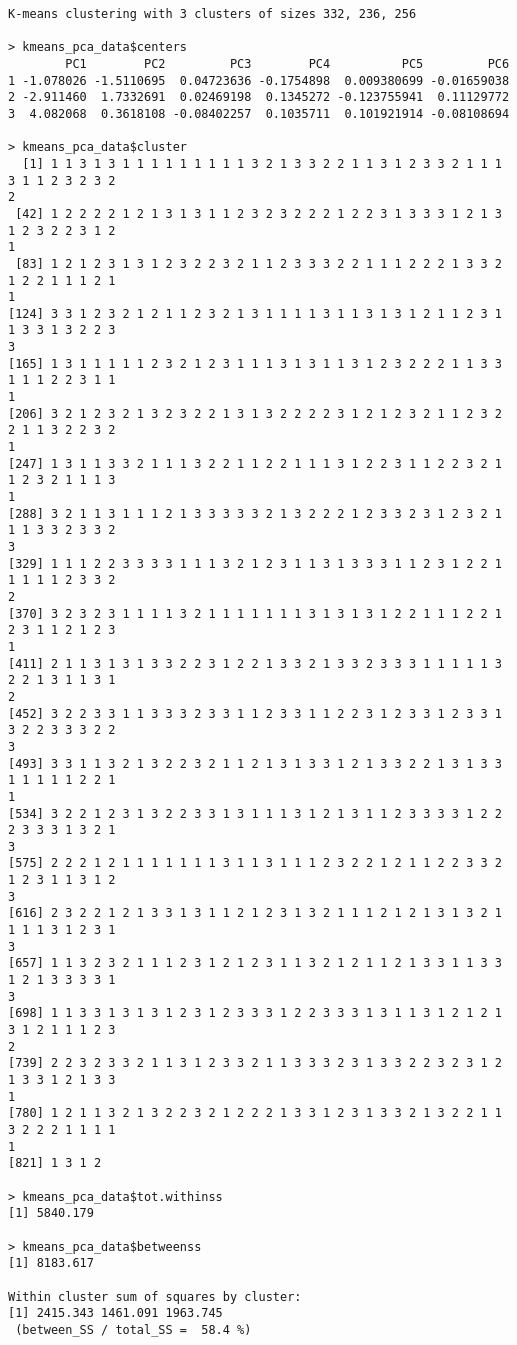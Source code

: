 \documentclass[11pt]{article}
\begin{document}
\begin{lstlisting}
K-means clustering with 3 clusters of sizes 332, 236, 256

> kmeans_pca_data$centers
        PC1        PC2         PC3        PC4          PC5         PC6
1 -1.078026 -1.5110695  0.04723636 -0.1754898  0.009380699 -0.01659038
2 -2.911460  1.7332691  0.02469198  0.1345272 -0.123755941  0.11129772
3  4.082068  0.3618108 -0.08402257  0.1035711  0.101921914 -0.08108694

> kmeans_pca_data$cluster
  [1] 1 1 3 1 3 1 1 1 1 1 1 1 1 1 3 2 1 3 3 2 2 1 1 3 1 2 3 3 2 1 1 1 3 1 1 2 3 2 3 2 
2
 [42] 1 2 2 2 2 1 2 1 3 1 3 1 1 2 3 2 3 2 2 2 1 2 2 3 1 3 3 3 1 2 1 3 1 2 3 2 2 3 1 2 
1
 [83] 1 2 1 2 3 1 3 1 2 3 2 2 3 2 1 1 2 3 3 3 2 2 1 1 1 2 2 2 1 3 3 2 1 2 2 1 1 1 2 1 
1
[124] 3 3 1 2 3 2 1 2 1 1 2 3 2 1 3 1 1 1 1 3 1 1 3 1 3 1 2 1 1 2 3 1 1 3 3 1 3 2 2 3 
3
[165] 1 3 1 1 1 1 1 2 3 2 1 2 3 1 1 1 3 1 3 1 1 3 1 2 3 2 2 2 1 1 3 3 1 1 1 2 2 3 1 1 
1
[206] 3 2 1 2 3 2 1 3 2 3 2 2 1 3 1 3 2 2 2 2 3 1 2 1 2 3 2 1 1 2 3 2 2 1 1 3 2 2 3 2 
1
[247] 1 3 1 1 3 3 2 1 1 1 3 2 2 1 1 2 2 1 1 1 3 1 2 2 3 1 1 2 2 3 2 1 1 2 3 2 1 1 1 3 
1
[288] 3 2 1 1 3 1 1 1 2 1 3 3 3 3 3 2 1 3 2 2 2 1 2 3 3 2 3 1 2 3 2 1 1 1 3 3 2 3 3 2 
3
[329] 1 1 1 2 2 3 3 3 3 1 1 1 3 2 1 2 3 1 1 3 1 3 3 3 1 1 2 3 1 2 2 1 1 1 1 1 2 3 3 2 
2
[370] 3 2 3 2 3 1 1 1 1 3 2 1 1 1 1 1 1 1 3 1 3 1 3 1 2 2 1 1 1 2 2 1 2 3 1 1 2 1 2 3 
1
[411] 2 1 1 3 1 3 1 3 3 2 2 3 1 2 2 1 3 3 2 1 3 3 2 3 3 3 1 1 1 1 1 3 2 2 1 3 1 1 3 1 
2
[452] 3 2 2 3 3 1 1 3 3 3 2 3 3 1 1 2 3 3 1 1 2 2 3 1 2 3 3 1 2 3 3 1 3 2 2 3 3 3 2 2 
3
[493] 3 3 1 1 3 2 1 3 2 2 3 2 1 1 2 1 3 1 3 3 1 2 1 3 3 2 2 1 3 1 3 3 1 1 1 1 1 2 2 1 
1
[534] 3 2 2 1 2 3 1 3 2 2 3 3 1 3 1 1 1 3 1 2 1 3 1 1 2 3 3 3 3 1 2 2 2 3 3 3 1 3 2 1 
3
[575] 2 2 2 1 2 1 1 1 1 1 1 1 3 1 1 3 1 1 1 2 3 2 2 1 2 1 1 2 2 3 3 2 1 2 3 1 1 3 1 2 
3
[616] 2 3 2 2 1 2 1 3 3 1 3 1 1 2 1 2 3 1 3 2 1 1 1 2 1 2 1 3 1 3 2 1 1 1 1 3 1 2 3 1 
3
[657] 1 1 3 2 3 2 1 1 1 2 3 1 2 1 2 3 1 1 3 2 1 2 1 1 2 1 3 3 1 1 3 3 1 2 1 3 3 3 3 1 
3
[698] 1 1 3 3 1 3 1 3 1 2 3 1 2 3 3 3 1 2 2 3 3 3 1 3 1 1 3 1 2 1 2 1 3 1 2 1 1 1 2 3 
2
[739] 2 2 3 2 3 3 2 1 1 3 1 2 3 3 2 1 1 3 3 3 2 3 1 3 3 2 2 3 2 3 1 2 1 3 3 1 2 1 3 3 
1
[780] 1 2 1 1 3 2 1 3 2 2 3 2 1 2 2 2 1 3 3 1 2 3 1 3 3 2 1 3 2 2 1 1 3 2 2 2 1 1 1 1 
1
[821] 1 3 1 2

> kmeans_pca_data$tot.withinss
[1] 5840.179

> kmeans_pca_data$betweenss
[1] 8183.617

Within cluster sum of squares by cluster:
[1] 2415.343 1461.091 1963.745
 (between_SS / total_SS =  58.4 %)
\end{lstlisting}
\end{document}
